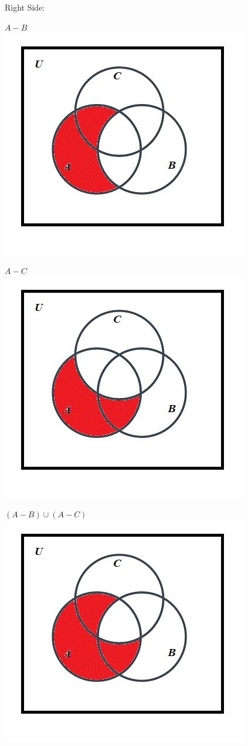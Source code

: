 \documentclass[10pt]{article}
\begin{document}
Right Side:

$A - B$\\
\includegraphics[scale=0.55]{18}

$A - C$\\
\includegraphics[scale=0.55]{23}

$(A - B) \cup (A - C)$\\
\includegraphics[scale=0.55]{22}
\end{document}
